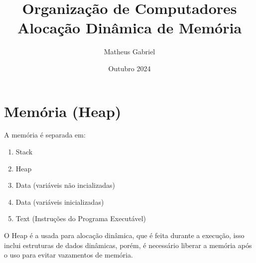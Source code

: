 \documentclass{article}
\title{Organização de Computadores \\
    \large Alocação Dinâmica de Memória}
\author{Matheus Gabriel}
\date{Outubro 2024}
\begin{document}
\maketitle

\section{Memória (Heap)}

A memória é separada em:
\begin{enumerate}
    \item Stack
    \item Heap
    \item Data (variáveis não incializadas)
    \item Data (variáveis inicializadas)
    \item Text (Instruções do Programa Executável)
\end{enumerate}

O Heap é a usada para alocação dinâmica, que é feita durante a execução, isso inclui estruturas de dados dinâmicas, porém, é necessário liberar a memória após o uso para evitar vazamentos de memória.
\end{document}
